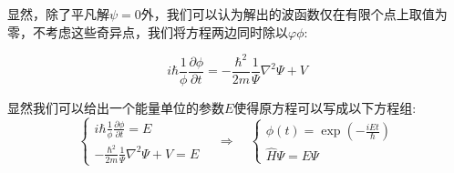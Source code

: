 显然，除了平凡解$\psi=0$外，我们可以认为解出的波函数仅在有限个点上取值为零，不考虑这些奇异点，我们将方程两边同时除以$\varphi$$\phi$:

\[i \hbar \frac{1}{\phi} \frac{\partial \phi}{\partial t}= -\frac{\hbar^2}{2m} \frac{1}{\varPsi} \nabla^2 \varPsi+V\]

显然我们可以给出一个能量单位的参数$E$使得原方程可以写成以下方程组:
\[\left\{
\begin{array}{r}
i\hbar\frac{1}{\phi}\frac{\partial\phi}{\partial t}=E\\
-\frac{\hbar^2}{2m}\frac{1}{\varPsi}\nabla^2\varPsi+V=E
\end{array} \right. \quad \Rightarrow \quad
\left\{
\begin{array}{l}
\phi(t)=\exp(-\frac{iEt}{\hbar})\\
\hat{H}\varPsi=E\varPsi
\end{array} \right.\]

